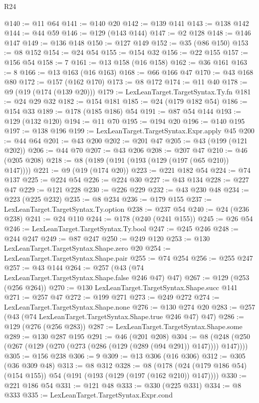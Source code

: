 \begin{lexlean}{R24}
\begin{coremodule}
{{{{{{{{{{{{{{{{{{{{{{{{{{{{{{{{{{{@140 := @11 @64
@141 := @140 @20
@142 := @139 @141
@143 := @138 @142
@144 := @44 @59
@146 := @129 (@143 @144)
@147 := @2 @128
@148 := @146 @147
@149 := @136 @148
@150 := @127 @149
@152 := @35 (@86 @150)
@153 := @8 @152
@154 := @24 @54
@155 := @154 @32
@156 := @22 @155
@157 := @156 @54
@158 := 7
@161 := @13 @158 (@16 @158)
@162 := @36 @161
@163 := 8
@166 := @13 @163 (@16 @163)
@168 := @66 @166 @47
@170 := @43 @168 @80
@172 := @157 (@162 @170)
@173 := @8 @172
@174 := @11 @40
@178 := @9 (@19 (@174 (@139 @20)))
@179 := LexLeanTarget.TargetSyntax.Ty.fn
@181 := @24 @29 @32
@182 := @154 @181
@185 := @24 (@179 @182 @54)
@186 := @154 @33
@189 := @178 (@185 @186) @54
@191 := @87 @54 @144
@193 := @129 (@132 @120)
@194 := @11 @70
@195 := @194 @20
@196 := @140 @195
@197 := @138 @196
@199 := LexLeanTarget.TargetSyntax.Expr.apply @45
@200 := @44 @64
@201 := @43 @200
@202 := @201 @47
@205 := @43 (@199 (@121 @202))
@206 := @44 @70
@207 := @43 @206
@208 := @207 @47
@210 := @46 (@205 @208)
@218 := @8 (@189 (@191 (@193 (@129 (@197 (@65 @210)) @147))))
@221 := @9 (@19 (@174 @20))
@223 := @221 @182 @54
@224 := @74 @137
@225 := @224 @54
@226 := @224 @30
@227 := @43 @134
@228 := @227 @47
@229 := @121 @228
@230 := @226 @229
@232 := @43 @230 @48
@234 := @223 (@225 @232)
@235 := @8 @234
@236 := @179 @155
@237 := LexLeanTarget.TargetSyntax.Ty.option
@238 := @237 @54
@240 := @24 (@236 @238)
@241 := @24 @110
@244 := @178 (@240 (@241 @155))
@245 := @26 @54
@246 := LexLeanTarget.TargetSyntax.Ty.bool
@247 := @245 @246
@248 := @244 @247
@249 := @87 @247
@250 := @249 @120
@253 := @130 LexLeanTarget.TargetSyntax.Shape.zero @20
@254 := LexLeanTarget.TargetSyntax.Shape.pair
@255 := @74 @254
@256 := @255 @247
@257 := @43 @144
@264 := @257 (@43 (@74 LexLeanTarget.TargetSyntax.Shape.false @246 @47) @47)
@267 := @129 (@253 (@256 @264))
@270 := @130 LexLeanTarget.TargetSyntax.Shape.succ @141
@271 := @257 @47
@272 := @199 @271
@273 := @249 @272
@274 := LexLeanTarget.TargetSyntax.Shape.none
@276 := @130 @274 @20
@283 := @257 (@43 (@74 LexLeanTarget.TargetSyntax.Shape.true @246 @47) @47)
@286 := @129 (@276 (@256 @283))
@287 := LexLeanTarget.TargetSyntax.Shape.some
@289 := @130 @287 @195
@291 := @46 (@201 @208)
@304 := @8 (@248 (@250 (@267 (@129 (@270 (@273 (@286 (@129 (@289 (@94 @291)) @147)))) @147))))
@305 := @156 @238
@306 := 9
@309 := @13 @306 (@16 @306)
@312 := @305 (@36 @309 @48)
@313 := @8 @312
@328 := @8 (@178 (@24 (@179 @186 @54) (@154 @155)) @54 (@191 (@193 (@129 (@197 (@162 @210)) @147))))
@330 := @221 @186 @54
@331 := @121 @48
@333 := @330 (@225 @331)
@334 := @8 @333
@335 := LexLeanTarget.TargetSyntax.Expr.cond
}}}}}}}}}}}}}}}}}}}}}}}}}}}}}}}}}}}
\end{coremodule}
\end{lexlean}
